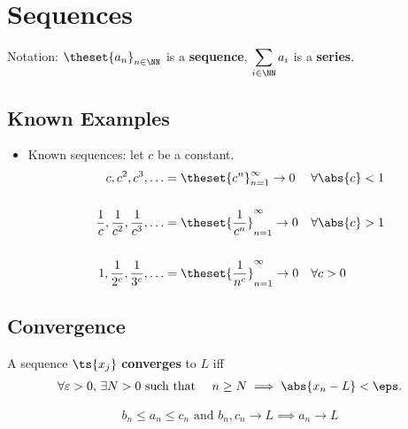 \hypertarget{sequences}{%
\section{Sequences}\label{sequences}}

Notation: \(\theset{a_n}_{n\in\NN}\) is a \textbf{sequence},
\(\displaystyle\sum_{i\in\NN} a_i\) is a \textbf{series}.

\hypertarget{known-examples}{%
\subsection{Known Examples}\label{known-examples}}

\begin{itemize}
\tightlist
\item
  Known sequences: let \(c\) be a constant.
  \begin{align*}
  c, c^2, c^3, \ldots 
  &= \theset{c^n}_{n=1}^\infty \to 0 
  && \forall \abs{c} < 1 \\ \\ 
  \frac{1}{c},\frac{1}{c^2},\frac{1}{c^3},\ldots 
  &= \theset{\frac{1}{c^n}}_{n=1}^\infty \to 0 
  &&\forall  \abs{c} > 1 \\ \\
  1,\frac{1}{2^c},\frac{1}{3^c},\ldots 
  &= \theset{\frac{1}{n^c}}_{n=1}^\infty \to 0 
  && \forall c > 0
  \end{align*}
\end{itemize}

\hypertarget{convergence}{%
\subsection{Convergence}\label{convergence}}

\begin{definition}

A sequence \(\ts{x_j}\) \textbf{converges} to \(L\) iff
\begin{align*}  
\forall \varepsilon > 0,\, \exists N > 0 \text{ such that } \quad n\geq N \implies \abs{x_n - L} < \eps
.\end{align*}

\end{definition}

\begin{theorem}

\begin{align*}
b_n \leq a_n \leq c_n \text{ and } b_n,c_n \to L \implies a_n \to L
\end{align*}

\end{theorem}

